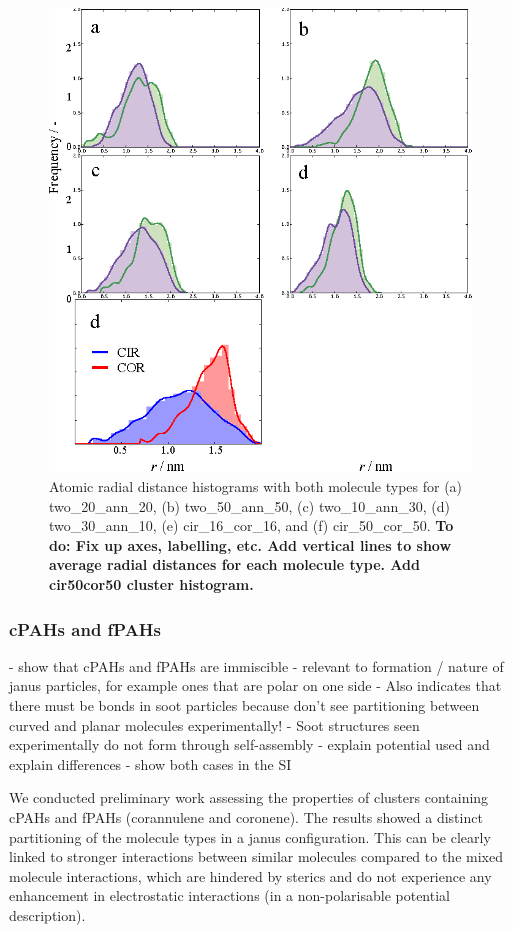 %
\begin{figure}[!tbh]
\centering
\includegraphics[width=0.8\linewidth]{Figures/radii_histograms_aa.eps}
\caption{Atomic radial distance histograms with both molecule types for (a) two\_20\_ann\_20, (b) two\_50\_ann\_50, (c) two\_10\_ann\_30, (d) two\_30\_ann\_10, (e) cir\_16\_cor\_16, and (f) cir\_50\_cor\_50. \textbf{To do: Fix up axes, labelling, etc. Add vertical lines to show average radial distances for each molecule type. Add cir50cor50 cluster histogram.}}
\label{fig:radialdists_atomic}
\end{figure}
%



\subsubsection{cPAHs and fPAHs}
- show that cPAHs and fPAHs are immiscible 
- relevant to formation / nature of janus particles, for example ones that are polar on one side
- Also indicates that there must be bonds in soot particles because don’t see partitioning between curved and planar molecules experimentally!
- Soot structures seen experimentally do not form through self-assembly
- explain potential used and explain differences - show both cases in the SI

We conducted preliminary work assessing the properties of clusters containing cPAHs and fPAHs (corannulene and coronene). The results showed a distinct partitioning of the molecule types in a janus configuration. This can be clearly linked to stronger interactions between similar molecules compared to the mixed molecule interactions, which are hindered by sterics and do not experience any enhancement in electrostatic interactions (in a non-polarisable potential description).

